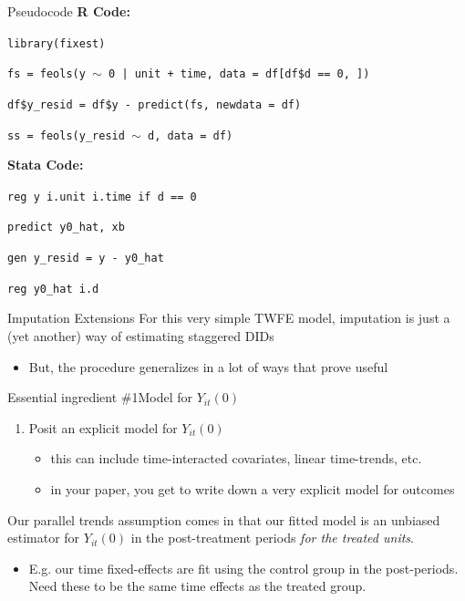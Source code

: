 \documentclass[t]{beamer}
\begin{document}
\begin{frame}{Pseudocode}
  \textbf{R Code:}
  \medskip

  \texttt{library(fixest)}

  \texttt{fs = feols(y $\sim$ 0 | unit + time, data = df[df\$d == 0, ])}

  \texttt{df\$y\_resid = df\$y - predict(fs, newdata = df)}

  \texttt{ss = feols(y\_resid $\sim$ d, data = df)}


  \bigskip\bigskip
  \textbf{Stata Code:}
  \medskip

  \texttt{reg y i.unit i.time if d == 0}

  \texttt{predict y0\_hat, xb}

  \texttt{gen y\_resid = y - y0\_hat}

  \texttt{reg y0\_hat i.d}
\end{frame}

\begin{frame}{Imputation Extensions}
  For this very simple TWFE model, imputation is just a (yet another) way of estimating staggered DIDs
  \begin{itemize}
    \item But, the procedure generalizes in a lot of ways that prove useful
  \end{itemize}
\end{frame}

\begin{frame}{Essential ingredient \#1}{Model for $Y_{it}(0)$}
  \begin{enumerate}
    \item Posit an explicit model for $Y_{it}(0)$
    \begin{itemize}
      \item this can include time-interacted covariates, linear time-trends, etc.
      
      \item in your paper, you get to write down a very explicit model for outcomes
    \end{itemize}
  \end{enumerate}

  Our parallel trends assumption comes in that our fitted model is an unbiased estimator for $Y_{it}(0)$ in the post-treatment periods \emph{for the treated units}.
  \begin{itemize}
    \item E.g. our time fixed-effects are fit using the control group in the post-periods. Need these to be the same time effects as the treated group.
  \end{itemize}
\end{frame}
\end{document}
